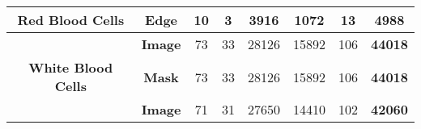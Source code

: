 \begin{table}[H]
{\begin{tabular}{|cc|c|c|c|c|c|c|}
\multicolumn{1}{|c|}{\multirow{-3}{*}{{\color[HTML]{000000} \textbf{Red Blood Cells}}}}   & {\color[HTML]{000000} \textbf{Edge}}  & {\color[HTML]{000000} 10}                                                              & {\color[HTML]{000000} 3}                                                              & {\color[HTML]{000000} 3916}                                                           & {\color[HTML]{000000} 1072}                                                          & {\color[HTML]{000000} 13}                                                              & {\color[HTML]{000000} \textbf{4988}}                                                  \\ \hline
\multicolumn{1}{|c|}{{\color[HTML]{000000} }}                                             & {\color[HTML]{000000} \textbf{Image}} & {\color[HTML]{000000} 73}                                                              & {\color[HTML]{000000} 33}                                                             & {\color[HTML]{000000} 28126}                                                          & {\color[HTML]{000000} 15892}                                                         & {\color[HTML]{000000} 106}                                                             & {\color[HTML]{000000} \textbf{44018}}                                                 \\ \cline{2-8} 
\multicolumn{1}{|c|}{\multirow{-2}{*}{{\color[HTML]{000000} \textbf{White Blood Cells}}}} & {\color[HTML]{000000} \textbf{Mask}}  & {\color[HTML]{000000} 73}                                                              & {\color[HTML]{000000} 33}                                                             & {\color[HTML]{000000} 28126}                                                          & {\color[HTML]{000000} 15892}                                                         & {\color[HTML]{000000} 106}                                                             & {\color[HTML]{000000} \textbf{44018}}                                                 \\ \hline
\multicolumn{1}{|c|}{{\color[HTML]{000000} }}                                             & {\color[HTML]{000000} \textbf{Image}} & {\color[HTML]{000000} 71}                                                              & {\color[HTML]{000000} 31}                                                             & {\color[HTML]{000000} 27650}                                                          & {\color[HTML]{000000} 14410}                                                         & {\color[HTML]{000000} 102}                                                             & {\color[HTML]{000000} \textbf{42060}}                                                 \\ \cline{2-8} 

\end{tabular}}
\end{table}
